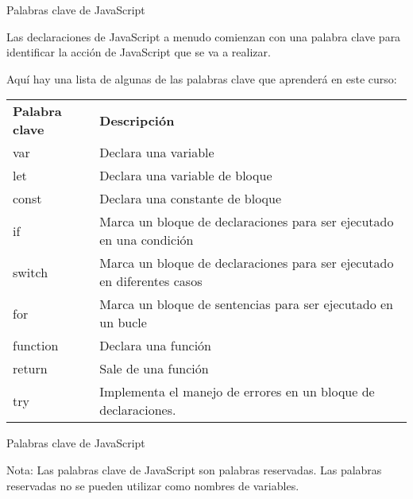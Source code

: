 \begin{frame}[c]{Palabras clave de JavaScript}

  Las declaraciones de JavaScript a menudo comienzan con una palabra
  clave para identificar la acción de JavaScript que se va a realizar.

  \vspace{\baselineskip}
  Aquí hay una lista de algunas de las palabras clave que aprenderá
  en este curso:

  \begin{table}[]
  \begin{tabular}{ll}
    \textbf{Palabra clave} &  \textbf{Descripción} \\
    \rowcolor{light-gray}
    var 	 & Declara una variable \\
    let 	 & Declara una variable de bloque \\
    \rowcolor{light-gray}
    const  & Declara una constante de bloque \\
    if 	   & Marca un bloque de declaraciones para ser
             ejecutado en una condición \\
    \rowcolor{light-gray}
    switch & Marca un bloque de declaraciones para ser ejecutado en
             diferentes casos \\
    for 	 & Marca un bloque de sentencias para ser ejecutado en un bucle \\
    \rowcolor{light-gray}
    function & Declara una función \\
    return & Sale de una función \\
    \rowcolor{light-gray}
    try 	 & Implementa el manejo de errores en un bloque de declaraciones. \\
  \end{tabular}
  \end{table}
\end{frame}

\begin{frame}[c]{Palabras clave de JavaScript}
  \begin{exampleblock}{Nota:}
    Las palabras clave de JavaScript son palabras reservadas.
    Las palabras reservadas no se pueden utilizar como nombres de variables.
  \end{exampleblock}
\end{frame}


